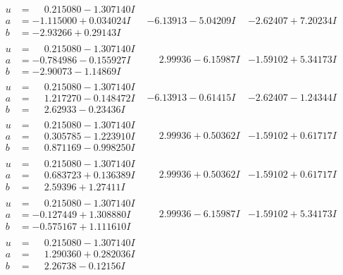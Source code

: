 \documentclass[1p]{elsarticle_modified}
\theoremstyle{definition}
\begin{document}
$$\begin{array}{c|c|c}
\begin{aligned}
u &= \phantom{-}0.215080 - 1.307140 I \\
a &= -1.115000 + 0.034024 I \\
b &= -2.93266 + 0.29143 I\end{aligned}
 & -6.13913 - 5.04209 I & -2.62407 + 7.20234 I \\ \hline\begin{aligned}
u &= \phantom{-}0.215080 - 1.307140 I \\
a &= -0.784986 - 0.155927 I \\
b &= -2.90073 - 1.14869 I\end{aligned}
 & \phantom{-}2.99936 - 6.15987 I & -1.59102 + 5.34173 I \\ \hline\begin{aligned}
u &= \phantom{-}0.215080 - 1.307140 I \\
a &= \phantom{-}1.217270 - 0.148472 I \\
b &= \phantom{-}2.62933 - 0.23436 I\end{aligned}
 & -6.13913 - 0.61415 I & -2.62407 - 1.24344 I \\ \hline\begin{aligned}
u &= \phantom{-}0.215080 - 1.307140 I \\
a &= \phantom{-}0.305785 - 1.223910 I \\
b &= \phantom{-}0.871169 - 0.998250 I\end{aligned}
 & \phantom{-}2.99936 + 0.50362 I & -1.59102 + 0.61717 I \\ \hline\begin{aligned}
u &= \phantom{-}0.215080 - 1.307140 I \\
a &= \phantom{-}0.683723 + 0.136389 I \\
b &= \phantom{-}2.59396 + 1.27411 I\end{aligned}
 & \phantom{-}2.99936 + 0.50362 I & -1.59102 + 0.61717 I \\ \hline\begin{aligned}
u &= \phantom{-}0.215080 - 1.307140 I \\
a &= -0.127449 + 1.308880 I \\
b &= -0.575167 + 1.111610 I\end{aligned}
 & \phantom{-}2.99936 - 6.15987 I & -1.59102 + 5.34173 I \\ \hline\begin{aligned}
u &= \phantom{-}0.215080 - 1.307140 I \\
a &= \phantom{-}1.290360 + 0.282036 I \\
b &= \phantom{-}2.26738 - 0.12156 I\end{aligned}

\end{array}$$
\end{document}
